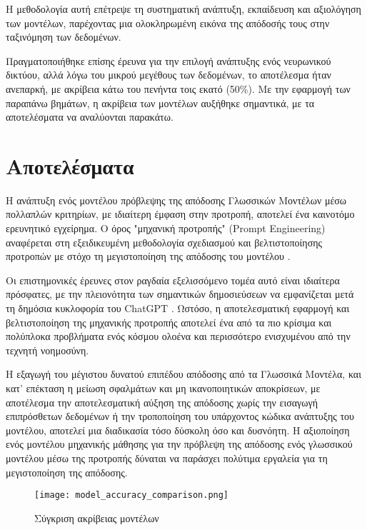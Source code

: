 Η μεθοδολογία αυτή επέτρεψε τη συστηματική ανάπτυξη, εκπαίδευση και
αξιολόγηση των μοντέλων, παρέχοντας μια ολοκληρωμένη εικόνα της απόδοσής
τους στην ταξινόμηση των δεδομένων.

Πραγματοποιήθηκε επίσης έρευνα για την επιλογή ανάπτυξης ενός νευρωνικού
δικτύου, αλλά λόγω του μικρού μεγέθους των δεδομένων, το αποτέλεσμα ήταν
ανεπαρκή, με ακρίβεια κάτω του πενήντα τοις εκατό (50\%). Με την
εφαρμογή των παραπάνω βημάτων, η ακρίβεια των μοντέλων αυξήθηκε
σημαντικά, με τα αποτελέσματα να αναλύονται παρακάτω.

\section{Αποτελέσματα}

Η ανάπτυξη ενός μοντέλου πρόβλεψης της απόδοσης Γλωσσικών Μοντέλων μέσω
πολλαπλών κριτηρίων, με ιδιαίτερη έμφαση στην προτροπή, αποτελεί ένα
καινοτόμο ερευνητικό εγχείρημα. Ο όρος "μηχανική προτροπής"
(\textlatin{Prompt Engineering}) αναφέρεται στη εξειδικευμένη
μεθοδολογία σχεδιασμού και βελτιστοποίησης προτροπών με στόχο τη
μεγιστοποίηση της απόδοσης του μοντέλου \cite{10.1162/tacl_a_00324,
chen2024unleashingpotentialpromptengineering}.

Οι επιστημονικές έρευνες στον ραγδαία εξελισσόμενο τομέα αυτό είναι
ιδιαίτερα πρόσφατες, με την πλειονότητα των σημαντικών δημοσιεύσεων να
εμφανίζεται μετά τη δημόσια κυκλοφορία του \textlatin{ChatGPT}
\cite{greshake2023youvesignedforcompromising,
white2023promptpatterncatalogenhance}. Ωστόσο, η αποτελεσματική
εφαρμογή και βελτιστοποίηση της μηχανικής προτροπής αποτελεί ένα από τα
πιο κρίσιμα και πολύπλοκα προβλήματα ενός κόσμου ολοένα και περισσότερο
ενισχυμένου από την τεχνητή νοημοσύνη.

Η εξαγωγή του μέγιστου δυνατού επιπέδου απόδοσης από τα Γλωσσικά
Μοντέλα, και κατ' επέκταση η μείωση σφαλμάτων και μη ικανοποιητικών
αποκρίσεων, με αποτέλεσμα την αποτελεσματική αύξηση της απόδοσης χωρίς
την εισαγωγή επιπρόσθετων δεδομένων ή την τροποποίηση του υπάρχοντος
κώδικα ανάπτυξης του μοντέλου, αποτελεί μια διαδικασία τόσο δύσκολη όσο
και δυσνόητη. Η αξιοποίηση ενός μοντέλου μηχανικής μάθησης για την
πρόβλεψη της απόδοσης ενός γλωσσικού μοντέλου μέσω της προτροπής
δύναται να παράσχει πολύτιμα εργαλεία για τη μεγιστοποίηση της απόδοσης.

\begin{figure}[H]
  \begin{center}
    \texttt{[image: model\_accuracy\_comparison.png]}
    \caption{Σύγκριση ακρίβειας μοντέλων}
  \end{center}
  \label{fig:accuracy}
\end{figure}

